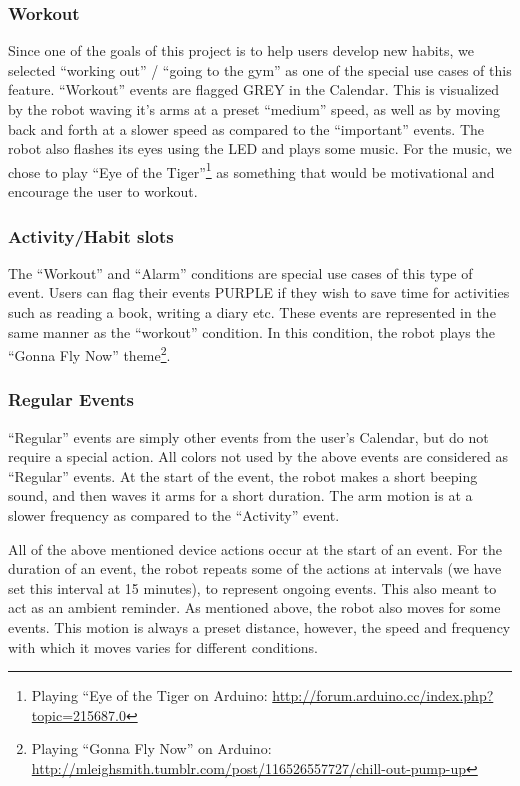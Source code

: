 \documentclass{sigchi-ext}
\begin{document}
\subsubsection{Workout}

Since one of the goals of this project is to help users develop new habits, we
selected ``working out'' / ``going to the gym'' as one of the special use cases of
this feature. ``Workout'' events are flagged GREY in the Calendar. This is
visualized by the robot waving it's arms at a preset ``medium'' speed, as well as
by moving back and forth at a slower speed as compared to the ``important''
events. The robot also flashes its eyes using the LED and plays some music. For
the music, we chose to play ``Eye of the Tiger''\footnote{Playing ``Eye of the
  Tiger on Arduino: \url{http://forum.arduino.cc/index.php?topic=215687.0}} as something that would be
motivational and encourage the user to workout.

\subsubsection{Activity/Habit slots}

The ``Workout'' and ``Alarm'' conditions are special use cases of this type of
event. Users can flag their events PURPLE if they wish to save time for
activities such as reading a book, writing a diary etc. These events are
represented in the same manner as the ``workout'' condition. In this condition,
the robot plays the ``Gonna Fly Now'' theme\footnote{Playing ``Gonna Fly Now''
  on Arduino:
  \url{http://mleighsmith.tumblr.com/post/116526557727/chill-out-pump-up}}.

\subsubsection{Regular Events}

``Regular'' events are simply other events from the user's Calendar, but do not
require a special action. All colors not used by the above events are
considered as ``Regular'' events. At the start of the event, the robot makes a
short beeping sound, and then waves it arms for a short duration. The arm
motion is at a slower frequency as compared to the ``Activity'' event.

All of the above mentioned device actions occur at the start of an event. For
the duration of an event, the robot repeats some of the actions at intervals
(we have set this interval at 15 minutes), to represent ongoing events. This also
meant to act as an ambient reminder. As mentioned above, the robot also moves
for some events. This motion is always a preset distance, however, the speed
and frequency with which it moves varies for different conditions.
\end{document}
